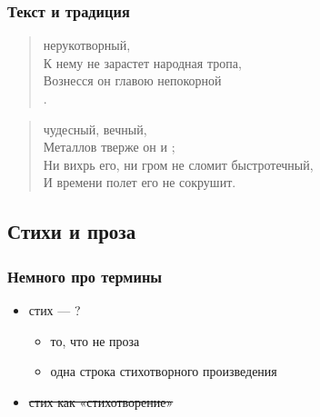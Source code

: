 \documentclass{beamer}
\begin{document}

\begin{frame}
\frametitle{Текст и традиция}

\begin{verse}
\color{red}{Я памятник себе воздвиг} \color{black}нерукотворный,\\
К нему не зарастет народная тропа,\\
Вознесся \color{green}{выше} \color{black}он главою непокорной\\
\color{green}{Александрийского столпа}.
\end{verse}

\begin{flushleft}
\color{black}{\large vs.}
\end{flushleft}

\begin{verse}
\color{red}{Я памятник себе воздвиг} \color{black}чудесный, вечный,\\
Металлов тверже он и \color{green}{выше пирамид};\\
\color{black}Ни вихрь его, ни гром не сломит быстротечный,\\
И времени полет его не сокрушит.
\end{verse}

\end{frame}


\subsection{Стихи и проза}\label{sec:diff}


\begin{frame}
\frametitle{Немного про термины}
\begin{itemize}
\item стих — ? 
\begin{itemize}
\item то, что не проза
\item одна строка стихотворного произведения
\end{itemize}
\item \sout{стих как «стихотворение»}
\end{itemize}
\end{frame}

\end{document}

